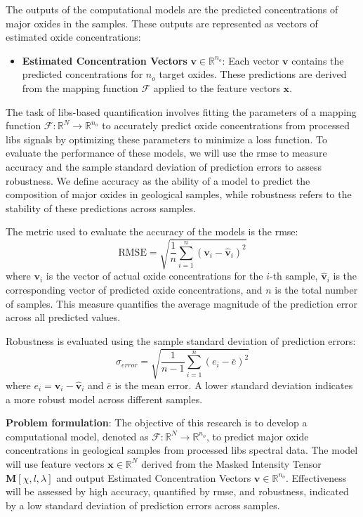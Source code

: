 The outputs of the computational models are the predicted concentrations of major oxides in the samples.
These outputs are represented as vectors of estimated oxide concentrations:

\begin{itemize}
    \item \textbf{Estimated Concentration Vectors} $\mathbf{v} \in \mathbb{R}^{n_o}$: Each vector $\mathbf{v}$ contains the predicted concentrations for $n_o$ target oxides. These predictions are derived from the mapping function $\mathcal{F}$ applied to the feature vectors $\mathbf{x}$.
\end{itemize}

The task of \gls{libs}-based quantification involves fitting the parameters of a mapping function $\mathcal{F}: \mathbb{R}^N \rightarrow \mathbb{R}^{n_o}$ to accurately predict oxide concentrations from processed \gls{libs} signals by optimizing these parameters to minimize a loss function.
To evaluate the performance of these models, we will use the \gls{rmse} to measure accuracy and the sample standard deviation of prediction errors to assess robustness.
We define accuracy as the ability of a model to predict the composition of major oxides in geological samples, while robustness refers to the stability of these predictions across samples.

The metric used to evaluate the accuracy of the models is the \gls{rmse}:
\[
\text{RMSE} = \sqrt{\frac{1}{n} \sum_{i=1}^{n} (\mathbf{v}_i - \hat{\mathbf{v}}_i)^2}
\]
where \( \mathbf{v}_i \) is the vector of actual oxide concentrations for the \( i \)-th sample, \( \hat{\mathbf{v}}_i \) is the corresponding vector of predicted oxide concentrations, and \( n \) is the total number of samples. 
This measure quantifies the average magnitude of the prediction error across all predicted values.

Robustness is evaluated using the sample standard deviation of prediction errors:
\[
\sigma_{error} = \sqrt{\frac{1}{n-1} \sum_{i=1}^{n} (e_i - \bar{e})^2}
\]
where \( e_i = \mathbf{v}_i - \hat{\mathbf{v}}_i \) and \( \bar{e} \) is the mean error.
A lower standard deviation indicates a more robust model across different samples.

\textbf{Problem formulation}:
The objective of this research is to develop a computational model, denoted as $\mathcal{F}: \mathbb{R}^N \rightarrow \mathbb{R}^{n_o}$, to predict major oxide concentrations in geological samples from processed \gls{libs} spectral data. 
The model will use feature vectors $\mathbf{x} \in \mathbb{R}^N$ derived from the Masked Intensity Tensor $\mathbf{M}[\chi, l, \lambda]$ and output Estimated Concentration Vectors $\mathbf{v} \in \mathbb{R}^{n_o}$. 
Effectiveness will be assessed by high accuracy, quantified by \gls{rmse}, and robustness, indicated by a low standard deviation of prediction errors across samples.


